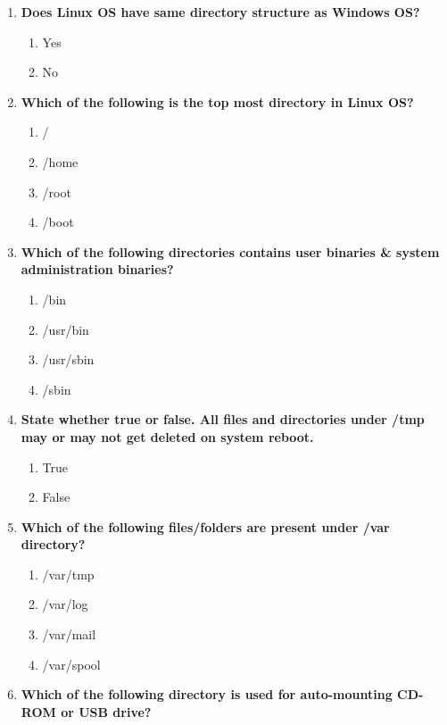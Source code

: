 \begin{flushleft}
	\begin{enumerate}
		\item \textbf{Does Linux OS have same directory structure as Windows OS?}
		\begin{enumerate}[label=(\alph*)]
			\item Yes
			\item No    %
		\end{enumerate}
		\bigskip
		\bigskip
		\item \textbf{Which of the following is the top most directory in Linux OS?}
		\begin{enumerate}[label=(\alph*)]
			\item /         %
			\item /home
			\item /root
			\item /boot
		\end{enumerate}
		\bigskip
		\bigskip
		\item \textbf{Which of the following directories contains user binaries \& system administration binaries? }
		\begin{enumerate}[label=(\alph*)]
			\item /bin             %
			\item /usr/bin %
			\item /usr/sbin %
			\item /sbin %
		\end{enumerate}
		\bigskip
		\bigskip
		\item \textbf{State whether true or false. All files and directories under /tmp may or may not get deleted on system reboot.}
		\begin{enumerate}[label=(\alph*)]
			\item True          %
			\item False
		\end{enumerate}
		\bigskip
		\bigskip
		\item \textbf{Which of the following files/folders are present under /var directory?}
		\begin{enumerate}[label=(\alph*)]
			\item /var/tmp   %
			\item /var/log   %
			\item /var/mail  %
			\item /var/spool  %
		\end{enumerate}
		\bigskip
		\bigskip
		\item \textbf{Which of the following directory is used for auto-mounting CD-ROM or USB drive?}

\end{enumerate}
\end{flushleft}

